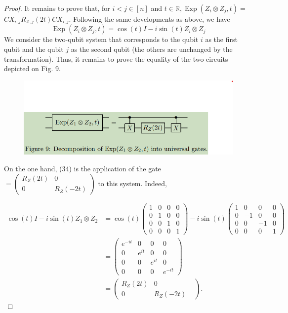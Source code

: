 \begin{proof}
It remains to prove that, for $i<j \in[n]$ and $t \in \mathbb{R}, \operatorname{Exp}\left(Z_{i} \otimes Z_{j}, t\right)=$ $C X_{i, j} R_{Z, j}(2 t) C X_{i, j}$. Following the same developments as above, we have
\begin{equation*}
\operatorname{Exp}\left(Z_{i} \otimes Z_{j}, t\right)=\cos (t) I-i \sin (t) Z_{i} \otimes Z_{j} \tag{34}
\end{equation*}
We consider the two-qubit system that corresponds to the qubit $i$ as the first qubit and the qubit $j$ as the second qubit (the others are unchanged by the transformation). Thus, it remains to prove the equality of the two circuits depicted on Fig. 9.
\begin{figure}
    \centering
    \includegraphics[width=0.75\linewidth]{Images/grange23-f9.png}
\end{figure}
On the one hand, (34) is the application of the gate $=\left(\begin{array}{cc}R_{Z}(2 t) & 0 \\ 0 & R_{Z}(-2 t)\end{array}\right)$ to this system. Indeed,

$$
\begin{aligned}
\cos (t) I-i \sin (t) Z_{1} \otimes Z_{2} & =\cos (t)\left(\begin{array}{llll}
1 & 0 & 0 & 0 \\
0 & 1 & 0 & 0 \\
0 & 0 & 1 & 0 \\
0 & 0 & 0 & 1
\end{array}\right)-i \sin (t)\left(\begin{array}{cccc}
1 & 0 & 0 & 0 \\
0 & -1 & 0 & 0 \\
0 & 0 & -1 & 0 \\
0 & 0 & 0 & 1
\end{array}\right) \\
& =\left(\begin{array}{cccc}
e^{-i t} & 0 & 0 & 0 \\
0 & e^{i t} & 0 & 0 \\
0 & 0 & e^{i t} & 0 \\
0 & 0 & 0 & e^{-i t}
\end{array}\right) \\
& =\left(\begin{array}{ccc}
R_{Z}(2 t) & 0 & \\
0 & R_{Z}(-2 t)
\end{array}\right) .
\end{aligned}
$$


\end{proof}
